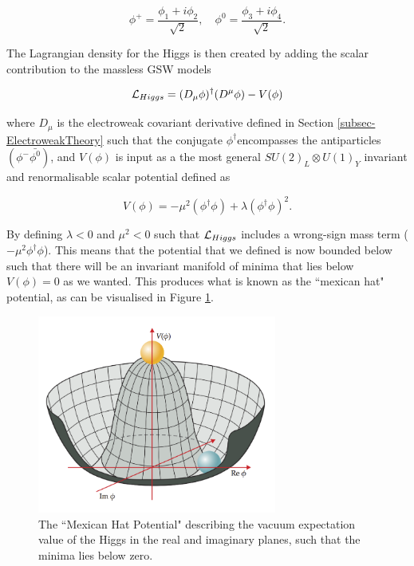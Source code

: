\begin{equation}
\phi^+ = \frac{\phi_1 + i \phi_2}{\sqrt{2}}, \quad \phi^0 = \frac{\phi_3 + i\phi_4}{\sqrt{2}}.
\end{equation}

The Lagrangian density for the Higgs is then created by adding the scalar contribution to the massless GSW models

\begin{equation}
\mathcal{L}_{Higgs} = (D_{\mu}\phi)^{\dagger}(D^{\mu}\phi) - V(\phi)
\end{equation}

where $D_{\mu}$ is the electroweak covariant derivative defined in Section \ref{subsec-ElectroweakTheory} such that the conjugate $\phi^{\dagger}$encompasses the antiparticles $(\phi^-\bar{\phi^0})$, and $V(\phi)$ is input as a the most general $SU(2)_L \otimes U(1)_Y$ invariant and renormalisable scalar potential defined as

\begin{equation}
V(\phi) = -\mu^2(\phi^{\dagger}\phi) + \lambda(\phi^{\dagger}\phi)^2.
\end{equation}

By defining $\lambda < 0$ and $\mu^2 < 0$ such that $\mathcal{L}_{Higgs}$ includes a wrong-sign mass term ($-\mu^2\phi^{\dagger}\phi$). This means that the potential that we defined is now bounded below such that there will be an invariant manifold of minima that lies below $V(\phi)=0$ as we wanted. This produces what is known as the ``mexican hat" potential, as can be visualised in Figure \ref{fig-MHP}.

\begin{figure} 
\begin{center}
\includegraphics[width=0.7\textwidth]{Figures/MexicanHatPotential.png}
\end{center}
\caption{The ``Mexican Hat Potential" describing the vacuum expectation value of the Higgs in the real and imaginary planes, such that the minima lies below zero.}
\label{fig-MHP}
\end{figure}

